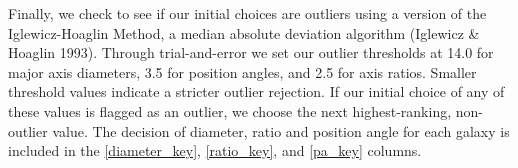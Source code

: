 \documentclass[iop]{emulateapj-rtx4}
\begin{document}
Finally, we check to see if our initial choices are outliers using a version of the Iglewicz-Hoaglin Method, a median absolute deviation algorithm (Iglewicz \& Hoaglin 1993). Through trial-and-error we set our outlier thresholds at 14.0 for major axis diameters, 3.5 for position angles, and 2.5 for axis ratios. Smaller threshold values indicate a stricter outlier rejection. If our initial choice of any of these values is flagged as an outlier, we choose the next highest-ranking, non-outlier value. The decision of diameter, ratio and position angle for each galaxy is included in the \ref{diameter_key}, \ref{ratio_key}, and \ref{pa_key} columns.


\end{document}
